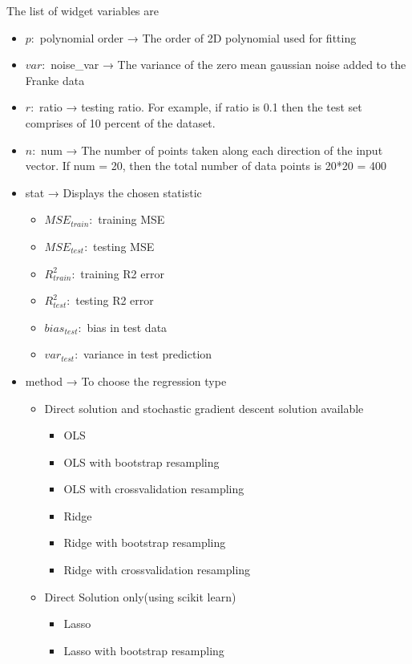 The list of widget variables are
\begin{itemize}
    \item $p:$  polynomial order → The order of 2D polynomial used for fitting
    \item $var:$  noise\_var → The variance of the zero mean gaussian noise added to the Franke data
    \item $r:$  ratio → testing ratio. For example, if ratio is 0.1 then the test set comprises of 10 percent of the dataset.
    \item $n:$  num → The number of points taken along each direction of the input vector. If num = 20, then the total number of data points is 20*20 = 400
    \item stat → Displays the chosen statistic
    \begin{itemize}
        \item $MSE_{train}:$ training MSE
        \item $MSE_{test}:$ testing MSE
        \item ${R^2_{train}}:$ training R2 error
        \item ${R^2_{test}}:$ testing R2 error
        \item $bias_{test}:$ bias in test data
        \item $var_{test}:$ variance in test prediction
    \end{itemize}
    \item method → To choose the regression type
    \begin{itemize}
        \item Direct solution and stochastic gradient descent solution available
        \begin{itemize}
            \item OLS
            \item OLS with bootstrap resampling
            \item OLS with crossvalidation resampling
            \item Ridge
            \item Ridge with bootstrap resampling
            \item Ridge with crossvalidation resampling
        \end{itemize}
        \item Direct Solution only(using scikit learn)
        \begin{itemize}
            \item Lasso
            \item Lasso with bootstrap resampling

\end{itemize}
\end{itemize}
\end{itemize}
